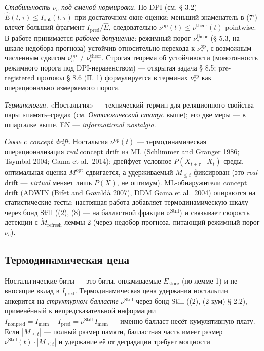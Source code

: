 \documentclass[pdflatex,sn-mathphys-ay]{sn-jnl}
\begin{document}
\emph{Стабильность \(\nu_c\) под сменой нормировки.} По DPI (см. § 3.2) \(\hat E(t,\tau) \le I_{\text{opt}}(t,\tau)\) при достаточном окне оценки; меньший знаменатель в (7') влечёт больший фрагмент \(I_{\text{pred}}/\hat E\), следовательно \(\nu^{\text{op}}(t) \le \nu^{\text{theor}}(t)\) pointwise. В работе принимается \emph{рабочее допущение}: режимный порог \(\nu_c^{\text{theor}}\) (§ 5.3, на шкале недобора прогноза) устойчив относительно перехода к \(\nu_c^{\text{op}}\), с возможным численным сдвигом \(\nu_c^{\text{op}} \ne \nu_c^{\text{theor}}\). Строгая теорема об устойчивости (монотонность режимного порога под DPI-неравенством) --- открытая задача § 8.5; pre-registered протокол § 8.6 (П. 1) формулируется в терминах \(\nu_c^{\text{op}}\) как операционально измеряемого порога.



\emph{Терминология.} «Ностальгия» --- технический термин для реляционного свойства пары «память--среда» (см. \emph{Онтологический статус} выше); его две меры --- в шпаргалке выше. EN --- \emph{informational nostalgia}.



\emph{Связь с concept drift.} Ностальгия \(\nu^{\text{op}}(t)\) --- термодинамическая операционализация \emph{real} concept drift из ML (Schlimmer and Granger 1986; Tsymbal 2004; Gama et al.~2014): дрейфует условное \(P(X_{t+\tau}\mid X_t)\) среды, оптимальная оценка \(M^{\text{opt}}\) сдвигается, а удерживаемый \(M_{\le t}\) фиксирован (это \emph{real} drift --- \emph{virtual} меняет лишь \(P(X)\), не оптимум). ML-обнаружители concept drift (ADWIN (Bifet and Gavaldà 2007), DDM Gama et al.~2004) опираются на статистические тесты; настоящая работа добавляет термодинамическую шкалу через бонд Still ((2), (8) --- на балластной фракции \(\nu^{\text{Still}}\)) и связывает скорость детекции с \(\dot{M}_{\text{refresh}}\) леммы 2 (через недобор прогноза, питающий режимный порог \(\nu_c\)).



\subsection{Термодинамическая цена}\label{ux442ux435ux440ux43cux43eux434ux438ux43dux430ux43cux438ux447ux435ux441ux43aux430ux44f-ux446ux435ux43dux430}



Ностальгические биты --- это биты, оплачиваемые \(E_{\text{store}}\) (по лемме 1) и не вносящие вклад в \(I_{\text{pred}}\). Термодинамическая цена удержания ностальгии анкерится на \emph{структурном балласте} \(\nu^{\text{Still}}\) через бонд Still ((2), (2-кум) § 2.2), применённый к непредсказательной информации \(I_{\text{nonpred}} = I_{\text{mem}} - I_{\text{pred}} = \nu^{\text{Still}}\, I_{\text{mem}}\) --- именно балласт несёт кумулятивную плату. Если \(|M_{\le t}|\) --- полный размер памяти, балластная часть имеет размер \(\nu^{\text{Still}}(t) \cdot |M_{\le t}|\) и удержание её от деградации требует мощности
\end{document}
